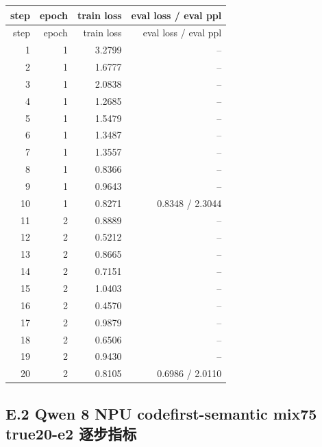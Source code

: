 \documentclass[11pt,a4paper]{article}
\begin{document}
\small
\begin{longtable}{r r r r}
\toprule
step & epoch & train loss & eval loss / eval ppl \\
\midrule
\endfirsthead
\toprule
step & epoch & train loss & eval loss / eval ppl \\
\midrule
\endhead
1 & 1 & 3.2799 & -- \\
2 & 1 & 1.6777 & -- \\
3 & 1 & 2.0838 & -- \\
4 & 1 & 1.2685 & -- \\
5 & 1 & 1.5479 & -- \\
6 & 1 & 1.3487 & -- \\
7 & 1 & 1.3557 & -- \\
8 & 1 & 0.8366 & -- \\
9 & 1 & 0.9643 & -- \\
10 & 1 & 0.8271 & 0.8348 / 2.3044 \\
11 & 2 & 0.8889 & -- \\
12 & 2 & 0.5212 & -- \\
13 & 2 & 0.8665 & -- \\
14 & 2 & 0.7151 & -- \\
15 & 2 & 1.0403 & -- \\
16 & 2 & 0.4570 & -- \\
17 & 2 & 0.9879 & -- \\
18 & 2 & 0.6506 & -- \\
19 & 2 & 0.9430 & -- \\
20 & 2 & 0.8105 & 0.6986 / 2.0110 \\
\bottomrule
\end{longtable}
\normalsize

\subsection{E.2 Qwen 8 NPU codefirst-semantic mix75 true20-e2 逐步指标}
\end{document}
